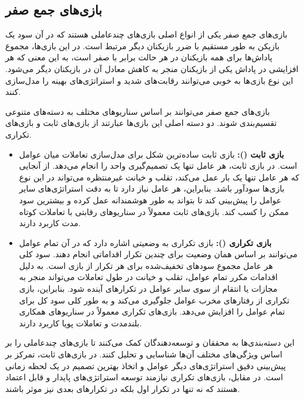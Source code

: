\subsection{بازی‌های جمع صفر}

بازی‌های جمع صفر
 یکی از انواع اصلی بازی‌های چندعاملی هستند که در آن سود یک بازیکن به طور مستقیم با ضرر بازیکنان دیگر مرتبط است. در این بازی‌ها، مجموع پاداش‌ها برای همه بازیکنان در هر حالت برابر با صفر است، به این معنی که هر افزایشی در پاداش یکی از بازیکنان منجر به کاهش معادل آن در بازیکنان دیگر می‌شود. این نوع بازی‌ها به خوبی می‌توانند رقابت‌های شدید و استراتژی‌های بهینه را مدل‌سازی کنند.

بازی‌های جمع صفر می‌توانند بر اساس سناریوهای مختلف به دسته‌های متنوعی تقسیم‌بندی شوند. دو دسته اصلی این بازی‌ها عبارتند از بازی‌های ثابت و بازی‌های تکراری.

\begin{itemize}
	\item \textbf{بازی ثابت ():} بازی ثابت ساده‌ترین شکل برای مدل‌سازی تعاملات میان عوامل است. در بازی ثابت، هر عامل تنها یک تصمیم‌گیری واحد را انجام می‌دهد. از آنجایی که هر عامل تنها یک بار عمل می‌کند، تقلب و خیانت غیرمنتظره می‌تواند در این نوع بازی‌ها سودآور باشد. بنابراین، هر عامل نیاز دارد تا به دقت استراتژی‌های سایر عوامل را پیش‌بینی کند تا بتواند به طور هوشمندانه عمل کرده و بیشترین سود ممکن را کسب کند. بازی‌های ثابت معمولاً در سناریوهای رقابتی با تعاملات کوتاه مدت کاربرد دارند.
	
	\item \textbf{بازی تکراری ():} بازی تکراری به وضعیتی اشاره دارد که در آن تمام عوامل می‌توانند بر اساس همان وضعیت برای چندین تکرار اقداماتی انجام دهند. سود کلی هر عامل مجموع سودهای تخفیف‌شده برای هر تکرار از بازی است. به دلیل اقدامات مکرر تمام عوامل، تقلب و خیانت در طول تعاملات می‌تواند منجر به مجازات یا انتقام از سوی سایر عوامل در تکرارهای آینده شود. بنابراین، بازی تکراری از رفتارهای مخرب عوامل جلوگیری می‌کند و به طور کلی سود کل برای تمام عوامل را افزایش می‌دهد. بازی‌های تکراری معمولاً در سناریوهای همکاری بلندمدت و تعاملات پویا کاربرد دارند.
\end{itemize}

این دسته‌بندی‌ها به محققان و توسعه‌دهندگان کمک می‌کنند تا بازی‌های چندعاملی را بر اساس ویژگی‌های مختلف آن‌ها شناسایی و تحلیل کنند. در بازی‌های ثابت، تمرکز بر پیش‌بینی دقیق استراتژی‌های دیگر عوامل و اتخاذ بهترین تصمیم در یک لحظه زمانی است. در مقابل، بازی‌های تکراری نیازمند توسعه استراتژی‌های پایدار و قابل اعتماد هستند که نه تنها در تکرار اول بلکه در تکرارهای بعدی نیز موثر باشند.

